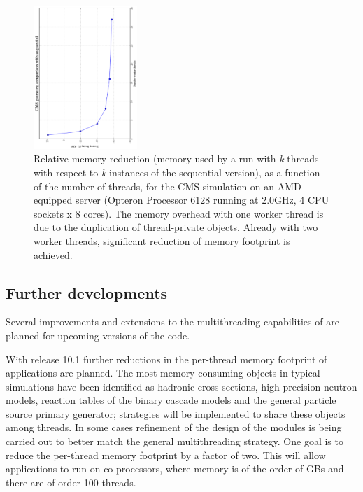 \begin{figure}
    \includegraphics[width=0.35\textwidth, angle=-90]{figures/MTMEM.pdf}
  \caption{Relative memory reduction (memory used by a run with {\it k} 
           threads with respect to {\it k} instances of the sequential version),
           as a function of the number of threads, for the CMS simulation on an
           AMD equipped server (Opteron Processor 6128 running at 2.0GHz, 4 CPU
           sockets x 8 cores). The memory overhead with one worker thread is due 
           to the duplication of thread-private objects.  Already with two 
           worker threads, significant reduction of memory footprint is achieved.}
  \label{fig:memory}
\end{figure}

\subsection{\textbf{Further developments}}
Several improvements and extensions to the multithreading capabilities of 
\Gfour{} are planned for upcoming versions of the code.

With release 10.1 further reductions in the per-thread memory footprint of 
\Gfour{} applications are planned.  The most memory-consuming objects in typical 
simulations have been identified as hadronic cross sections, high precision
neutron models, reaction tables of the binary cascade models and the general 
particle source primary generator; strategies will be implemented to share these
objects among threads.  In some cases refinement of the design of the modules is
being carried out to better match the general multithreading strategy.  One goal
is to reduce the per-thread memory footprint by a factor of two.  This will 
allow applications to run on co-processors, where memory is of the order of GBs
and there are of order 100 threads.

